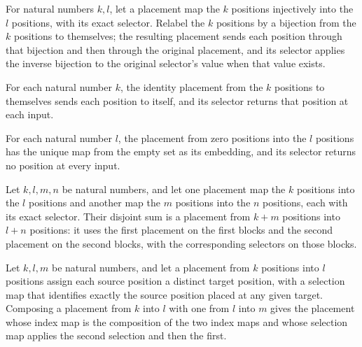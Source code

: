 \begin{definition}
\label{Complexity.clPlacement.permute}
\leanok
{}
For natural numbers $k,l$, let a placement map the $k$ positions injectively into the
$l$ positions, with its exact selector. Relabel the $k$ positions by a bijection from
the $k$ positions to themselves; the resulting placement sends each position through
that bijection and then through the original placement, and its selector applies the
inverse bijection to the original selector's value when that value exists.
\end{definition}

\begin{definition}
\label{Complexity.clPlacement.refl}
\leanok
{}
For each natural number $k$, the identity placement from the $k$ positions to themselves
sends each position to itself, and its selector returns that position at each input.
\end{definition}

\begin{definition}
\label{Complexity.clPlacement.empty}
\leanok
{}
For each natural number $l$, the placement from zero positions into the $l$ positions
has the unique map from the empty set as its embedding, and its selector returns no
position at every input.
\end{definition}

\begin{definition}
\label{Complexity.clPlacement.sum}
\leanok
{}
Let $k,l,m,n$ be natural numbers, and let one placement map the $k$ positions into the
$l$ positions and another map the $m$ positions into the $n$ positions, each with its
exact selector. Their disjoint sum is a placement from $k+m$ positions into $l+n$
positions: it uses the first placement on the first blocks and the second placement on
the second blocks, with the corresponding selectors on those blocks.
\end{definition}

\begin{definition}
\label{Complexity.clPlacement.comp}
\leanok
{}
Let $k,l,m$ be natural numbers, and let a placement from $k$ positions into $l$
positions assign each source position a distinct target position, with a selection map
that identifies exactly the source position placed at any given target. Composing a
placement from $k$ into $l$ with one from $l$ into $m$ gives the placement whose index
map is the composition of the two index maps and whose selection map applies the second
selection and then the first.
\end{definition}

